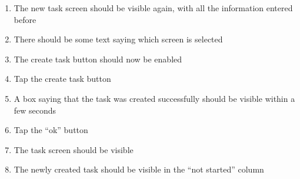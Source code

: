 \begin{enumerate}
    \item The new task screen should be visible again, with all the information entered before
    \item There should be some text saying which screen is selected
    \item The create task button should now be enabled
    \item Tap the create task button
    \item A box saying that the task was created successfully should be visible within a few seconds
    \item Tap the “ok” button
    \item The task screen should be visible
    \item The newly created task should be visible in the “not started” column
\end{enumerate}